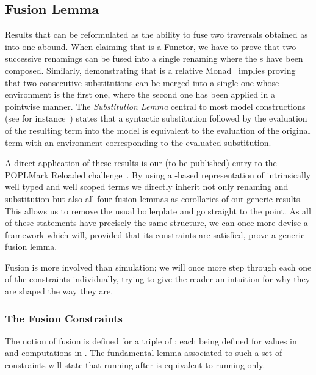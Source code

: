 
\subsection{Fusion Lemma}\label{section:fusion}

Results that can be reformulated as the ability to fuse two traversals
obtained as \semrec{} into one abound. When claiming that  is
a Functor, we have to prove that two successive renamings can be fused into
a single renaming where the s have been composed. Similarly,
demonstrating that  is a relative Monad~\cite{JFR4389} implies proving
that two consecutive substitutions can be merged into a single one whose
environment is the first one, where the second one has been applied in a
pointwise manner. The \emph{Substitution Lemma} central
to most model constructions (see for instance~\cite{mitchell1991kripke}) states
that a syntactic substitution followed by the evaluation of the resulting term
into the model is equivalent to the evaluation of the original term with an
environment corresponding to the evaluated substitution.

A direct application of these results is our (to be published) entry to the
POPLMark Reloaded challenge~\citeyear{poplmarkreloaded}. By using a -based
representation of intrinsically well typed and well scoped terms we directly inherit
not only renaming and substitution but also all four fusion lemmas as corollaries
of our generic results. This allows us to remove the usual boilerplate
and go straight to the point.
As all of these statements have precisely the same structure, we can
once more devise a framework which will, provided that its constraints are
satisfied, prove a generic fusion lemma.

Fusion is more involved than simulation; we will once more step through
each one of the constraints individually, trying to give the reader an intuition
for why they are shaped the way they are.

\subsubsection{The Fusion Constraints}

The notion of fusion is defined for a triple of ; each 
being defined for values in  and computations in . The
fundamental lemma associated to such a set of constraints will state that
running  after  is equivalent to running  only.

